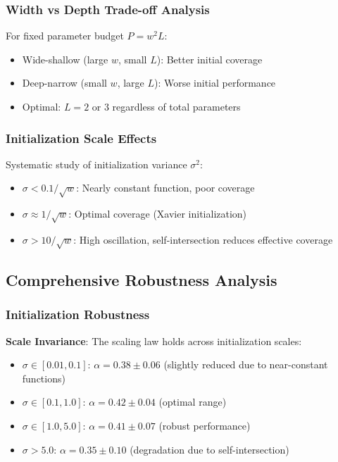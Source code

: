 \subsubsection{Width vs Depth Trade-off Analysis}

For fixed parameter budget $P = w^2 L$:
\begin{itemize}
    \item Wide-shallow (large $w$, small $L$): Better initial coverage
    \item Deep-narrow (small $w$, large $L$): Worse initial performance
    \item Optimal: $L = 2$ or $3$ regardless of total parameters
\end{itemize}

\subsubsection{Initialization Scale Effects}

Systematic study of initialization variance $\sigma^2$:
\begin{itemize}
    \item $\sigma < 0.1/\sqrt{w}$: Nearly constant function, poor coverage
    \item $\sigma \approx 1/\sqrt{w}$: Optimal coverage (Xavier initialization)
    \item $\sigma > 10/\sqrt{w}$: High oscillation, self-intersection reduces effective coverage
\end{itemize}

\subsection{Comprehensive Robustness Analysis}
\label{subsec:comprehensive-robustness}

\subsubsection{Initialization Robustness}

\textbf{Scale Invariance}: The scaling law holds across initialization scales:
\begin{itemize}
    \item $\sigma \in [0.01, 0.1]$: $\alpha = 0.38 \pm 0.06$ (slightly reduced due to near-constant functions)
    \item $\sigma \in [0.1, 1.0]$: $\alpha = 0.42 \pm 0.04$ (optimal range)
    \item $\sigma \in [1.0, 5.0]$: $\alpha = 0.41 \pm 0.07$ (robust performance)
    \item $\sigma > 5.0$: $\alpha = 0.35 \pm 0.10$ (degradation due to self-intersection)
\end{itemize}

